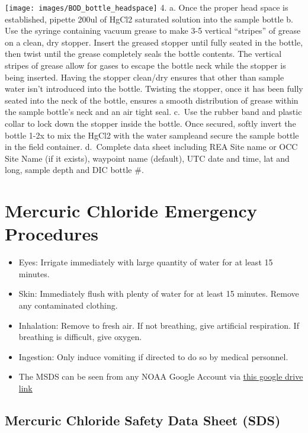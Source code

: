 \documentclass[
]{book}
\providecommand{\tightlist}{%
  \setlength{\itemsep}{0pt}\setlength{\parskip}{0pt}}
\begin{document}
\texttt{[image: images/BOD\_bottle\_headspace]}
4.
a. Once the proper head space is established, pipette 200ul of HgCl2 saturated solution into the sample bottle
b. Use the syringe containing vacuum grease to make 3-5 vertical ``stripes'' of grease on a clean, dry stopper. Insert the greased stopper until fully seated in the bottle, then twist until the grease completely seals the bottle contents. The vertical stripes of grease allow for gases to escape the bottle neck while the stopper is being inserted. Having the stopper clean/dry ensures that other than sample water isn't introduced into the bottle. Twisting the stopper, once it has been fully seated into the neck of the bottle, ensures a smooth distribution of grease within the sample bottle's neck and an air tight seal.
c.~Use the rubber band and plastic collar to lock down the stopper inside the bottle. Once secured, softly invert the bottle 1-2x to mix the HgCl2 with the water sampleand secure the sample bottle in the field container.
d.~Complete data sheet including REA Site name or OCC Site Name (if it exists), waypoint name (default), UTC date and time, lat and long, sample depth and DIC bottle \#.

\hypertarget{mercuric-chloride-emergency-procedures}{%
\section{Mercuric Chloride Emergency Procedures}\label{mercuric-chloride-emergency-procedures}}

\begin{itemize}
\tightlist
\item
  Eyes: Irrigate immediately with large quantity of water for at least 15 minutes.
\item
  Skin: Immediately flush with plenty of water for at least 15 minutes. Remove any contaminated clothing.
\item
  Inhalation: Remove to fresh air. If not breathing, give artificial respiration. If breathing is difficult, give oxygen.
\item
  Ingestion: Only induce vomiting if directed to do so by medical personnel.
\item
  The MSDS can be seen from any NOAA Google Account via \href{https://drive.google.com/open?id=12w0Kmi8VVE9n_0A5_BhNVq6l4nMDtM1K}{this google drive link}
\end{itemize}

\hypertarget{mercuric-chloride-safety-data-sheet-sds}{%
\subsection{Mercuric Chloride Safety Data Sheet (SDS)}\label{mercuric-chloride-safety-data-sheet-sds}}
\end{document}
